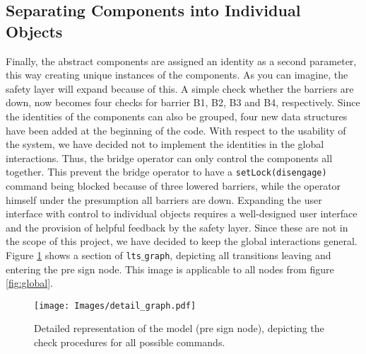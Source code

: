 \subsection{Separating Components into Individual Objects}
\label{sec:ids}
Finally, the abstract components are assigned an  identity as a second parameter, this way creating unique instances of the components. As you can imagine, the safety layer will expand because of this. A simple check whether the barriers are down, now becomes four checks for barrier B1, B2, B3 and B4, respectively. Since the identities of the components can also be grouped, four new data structures have been added at the beginning of the code. With respect to the usability of the system, we have decided not to implement the identities in the global interactions. Thus, the bridge operator can only control the components all together. This prevent the bridge operator to have a \texttt{setLock(disengage)} command being blocked because of three lowered barriers, while the operator himself under the presumption all barriers are down. Expanding the user interface with control to individual objects requires a well-designed user interface and the provision of helpful feedback by the safety layer. Since these are not in the scope of this project, we have decided to keep the global interactions general. Figure \ref{fig:detailed} shows a section of \texttt{lts$\_$graph}, depicting all transitions leaving and entering the pre sign node. This image is applicable to all nodes from figure \ref{fig:global}.
%
\begin{figure}[htb]
\centering
\texttt{[image: Images/detail\_graph.pdf]}
\caption{Detailed representation of the model (pre sign node), depicting the check procedures for all possible commands.}%
\label{fig:detailed}
\end{figure}%
%

